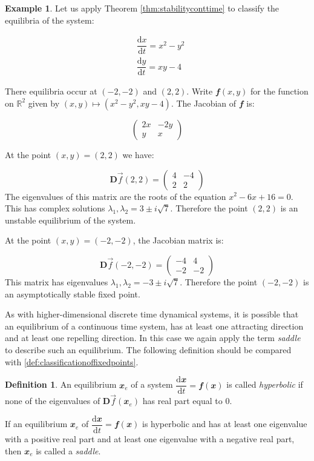\documentclass[
  a4paper,
  oneside,
  final]{krantz}
\newcommand{\R}{\mathbb{R}}
\renewcommand{\d}{\mathrm{d}}
\renewcommand{\v}[1]{{\mathbfit{#1}}}
\newcommand{\der}[2]{\dfrac{\d #1}{\d #2}}
\newcommand{\jacob}{{\mathbf{D}}\vec{f}}
\theoremstyle{definition}
\newtheorem{definition}{Definition}[chapter]
\theoremstyle{definition}
\newtheorem{example}{Example}[chapter]
\theoremstyle{definition}
\theoremstyle{definition}
\theoremstyle{remark}
\begin{document}
\begin{example}
Let us apply Theorem \ref{thm:stabilityconttime} to classify the equilibria of the system:

\begin{align*}
    &\der{x}{t} = x^2 - y^2 \\
    &\der{y}{t} = xy -4
\end{align*}

There equilibria occur at \((-2,-2)\) and \((2,2)\). Write \(\v{f}(x,y)\) for the function on \(\R^2\) given by \((x,y) \mapsto (x^2 - y^2, xy-4)\). The Jacobian of \(\v{f}\) is:

\[\begin{pmatrix}
 2x & -2y \\
 y & x
\end{pmatrix}\]

At the point \((x,y) = (2,2)\) we have:

\[\jacob(2,2) = \begin{pmatrix}
                    4 & -4 \\
                    2 & 2
                \end{pmatrix}\]
The eigenvalues of this matrix are the roots of the equation \(x^2 - 6x + 16 = 0\). This has complex solutions \(\lambda_1,\lambda_2 = 3 \pm i\sqrt{7}\). Therefore the point \((2,2)\) is an unstable equilibrium of the system.

At the point \((x,y) = (-2,-2)\), the Jacobian matrix is:

\[\jacob(-2,-2) = \begin{pmatrix}
                    -4 & 4 \\
                    -2 & -2
                \end{pmatrix}\]
This matrix has eigenvalues \(\lambda_1, \lambda_2 = -3 \pm i\sqrt{7}\). Therefore the point \((-2,-2)\) is an asymptotically stable fixed point.
\end{example}

As with higher-dimensional discrete time dynamical systems, it is possible that an equilibrium of a continuous time system, has at least one attracting direction and at least one repelling direction. In this case we again apply the term \emph{saddle} to describe such an equilibrium. The following definition should be compared with \ref{def:classificationoffixedpoints}.

\begin{definition}
\protect\hypertarget{def:classification-of-equilibria}{}\label{def:classification-of-equilibria}An equilibrium \(\v{x}_{e}\) of a system \(\der{\v{x}}{t} = \v{f}(\v{x})\) is called \emph{hyperbolic} if none of the eigenvalues of \(\jacob(\v{x}_{e})\) has real part equal to \(0\).

If an equilibrium \(\v{x}_{e}\) of \(\der{\v{x}}{t} = \v{f}(\v{x})\) is hyperbolic and has at least one eigenvalue with a positive real part and at least one eigenvalue with a negative real part, then \(\v{x}_{e}\) is called a \emph{saddle}.
\end{definition}
\end{document}
